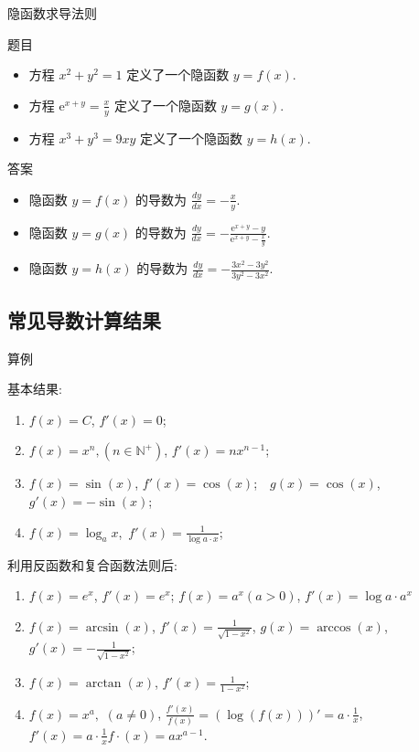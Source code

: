 \documentclass[
10pt,
aspectratio=43,
]{beamer}
\begin{document}
\begin{frame}{隐函数求导法则}
	\begin{block}{题目}
		\begin{itemize}
			\item 方程 $x^2 + y^2 = 1$ 定义了一个隐函数 $y = f(x)$.
			\item 方程 $\displaystyle\mathrm{e}^{x+y}=\frac{x}{y}$ 定义了一个隐函数 $y = g(x)$.
			\item 方程 $x^3 + y^3 = 9xy$ 定义了一个隐函数 $y = h(x)$.
		\end{itemize}
	\end{block}

	\pause

	\begin{exampleblock}{答案}
		\begin{itemize}
			\item 隐函数 $y = f(x)$ 的导数为 $\displaystyle\frac{{dy}}{{dx}} = -\frac{{x}}{{y}}.$
			\item 隐函数 $y = g(x)$ 的导数为 $\displaystyle\frac{{dy}}{{dx}} = -\frac{{\mathrm{e}^{x+y}-y}}{{\mathrm{e}^{x+y}-\frac{x}{y}}}.$
			\item 隐函数 $y = h(x)$ 的导数为 $\displaystyle\frac{{dy}}{{dx}} = -\frac{{3x^2 - 3y^2}}{{3y^2 - 3x^2}}.$
		\end{itemize}
	\end{exampleblock}
\end{frame}

\subsection{常见导数计算结果}
\begin{frame}{算例}
	\begin{block}{}
		{\small 基本结果:
			\begin{enumerate}
				\item $f(x)=C$,  $f'(x) =0$;
				\item $f(x)=x^n, (n\in\mathbb{N}^+)$,  $f'(x) = n x^{n-1}$;
				\item $f(x)=\sin(x)$,  $f'(x)=\cos(x)$; \,\, $g(x)=\cos(x)$,  $g'(x)=-\sin(x)$;
				\item $f(x)=\log_a  x$,\, $f'(x)= \displaystyle\frac{1}{\log a \cdot x}$;
			\end{enumerate}
			利用反函数和复合函数法则后:
			\begin{enumerate}
				\item $f(x) = e^x$, $f'(x) = e^x$; $f(x)=a^x(a>0)$, $f'(x)=\log a \cdot a^x$
				\item $f(x) = \arcsin(x)$, $f'(x) = \displaystyle\frac{1}{\sqrt{1-x^2}}$, $g(x) = \arccos(x)$, $g'(x) = \displaystyle-\frac{1}{\sqrt{1-x^2}}$;
				\item $f(x) = \arctan(x)$, $f'(x) = \displaystyle\frac{1}{1-x^2}$;
				\item $f(x) = x^a,\,\,(a\neq0)$, $\displaystyle\frac{f'(x)}{f(x)}=\left(\log(f(x))\right)'=a\cdot \frac 1x$, $\displaystyle f'(x)=a\cdot\frac1xf\cdot(x)=ax^{a-1}$.
			\end{enumerate}
		}
	\end{block}
\end{frame}
\end{document}

